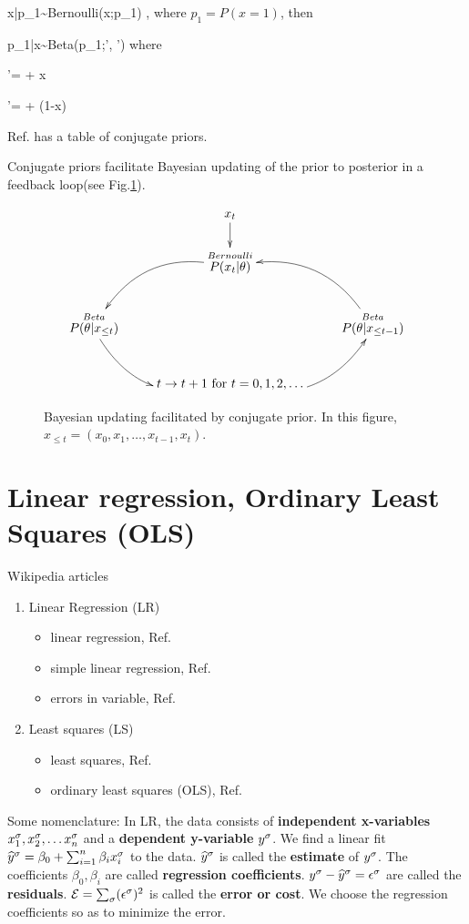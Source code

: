 \beq
x|p_1\sim {\rm Bernoulli}(x;p_1)
\;,
\eeq
where $p_1=P(x=1)$,
then

\beq
p_1|x\sim {\rm Beta}(p_1;\alp', \beta')
\eeq
where

\beq
\alp'= \alp + x
\eeq

\beq
\beta'= \beta + (1-x)
\eeq


Ref.\cite{wiki-conj-prior}
has a table of
conjugate priors.

Conjugate priors facilitate
Bayesian updating
of the prior to
posterior in a
feedback loop(see Fig.\ref{fig-conj-prior}).

\begin{figure}[h!]
$$\xymatrix{
&x_t\ar[d]
\\
&\stackrel{Bernoulli}{P(x_t|\theta)}\ar@/_2pc/[ld]
\\
\stackrel{Beta}{P(\theta|x_{\leq t})}\ar@/_2pc/[rd]
&&\stackrel{Beta}{P(\theta|x_{\leq t-1})}\ar@/_2pc/[ul]
\\
&t\rarrow t+1 \text{ for } t=0, 1, 2,\ldots
\ar@/_2pc/[ur]
}$$
\caption{Bayesian updating facilitated
by conjugate prior. In this figure,
$x_{\leq t}=(x_0, x_1, \ldots, x_{t-1}, x_t)$.}
\label{fig-conj-prior}
\end{figure}


\section{Linear regression, Ordinary Least Squares (OLS)}
\label{sec0-conv-lr}
Wikipedia articles
\begin{enumerate}
\item
Linear Regression (LR)
\begin{itemize}
\item
linear regression, Ref.\cite{wiki-lr}
\item
 simple linear regression, Ref.\cite{wiki-slr}
\item
errors in variable, Ref.\cite{wiki-errors-in-iv}

\end{itemize}
\item
Least squares (LS)
\begin{itemize}
\item
least squares, Ref.\cite{wiki-lsquares}
\item
ordinary least squares (OLS), Ref.\cite{wiki-ols}
\end{itemize}
\end{enumerate}


Some nomenclature: In LR, the
data consists of
{\bf independent x-variables} $x^\sigma_1,
 x^\sigma_2, \ldots x^\sigma_n$
and a {\bf dependent y-variable} $y^\sigma$.
We find a linear fit ${\widehat{y}}^\sigma =
\beta_0 + \sum_{i=1}^n \beta_i x^\sigma_i$
to the data.
${\widehat{y}}^\sigma$ is called the {\bf estimate}
of $y^\sigma$.
 The coefficients $\beta_0, \beta_i$
are called {\bf regression coefficients}.
$y^\sigma-{\widehat{y}}^\sigma=\epsilon^\sigma$
are called  the {\bf residuals}.
${\cal E} =\sum_\sigma (\epsilon^\sigma)^2$
is called the {\bf error or cost}. We choose the
regression coefficients
so as to minimize the error.

